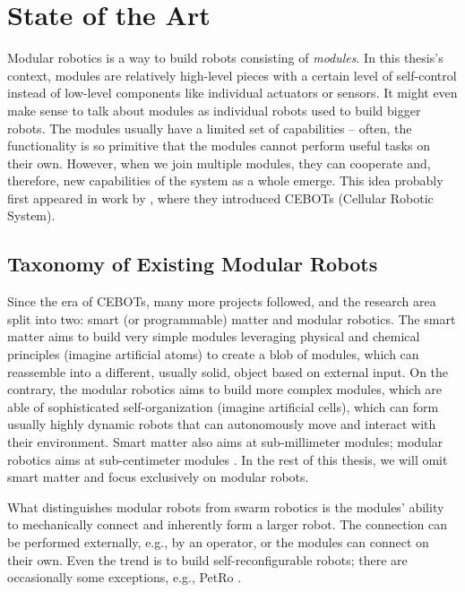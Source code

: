 \chapter{State of the Art}\label{chap:state-of-the-art}

Modular robotics is a way to build robots consisting of \emph{modules}. In this
thesis's context, modules are relatively high-level pieces with a certain level
of self-control instead of low-level components like individual actuators or
sensors. It might even make sense to talk about modules as individual robots
used to build bigger robots. The modules usually have a limited set of
capabilities -- often, the functionality is so primitive that the modules
cannot perform useful tasks on their own. However, when we join multiple
modules, they can cooperate and, therefore, new capabilities of the system as a
whole emerge. This idea probably first appeared in work by
\textcite{DBLP:conf/icra/FukudaK90}, where they introduced CEBOTs (Cellular
Robotic System).

\section{Taxonomy of Existing Modular Robots}

Since the era of CEBOTs, many more projects followed, and the research area
split into two: smart (or programmable) matter and modular robotics. The smart
matter aims to build very simple modules leveraging physical and chemical
principles (imagine artificial atoms) to create a blob of modules, which can
reassemble into a different, usually solid, object based on external input. On
the contrary, the modular robotics aims to build more complex modules, which are
able of sophisticated self-organization (imagine artificial cells), which can
form usually highly dynamic robots that can autonomously move and interact with
their environment. Smart matter also aims at sub-millimeter modules; modular
robotics aims at sub-centimeter modules \cite{DBLP:conf/ieeealife/Christensen07,
1285597}. In the rest of this thesis, we will omit smart matter and focus
exclusively on modular robots.

What distinguishes modular robots from swarm robotics is the modules' ability to
mechanically connect and inherently form a larger robot. The connection can be
performed externally, e.g., by an operator, or the modules can connect on their
own. Even the trend is to build self-reconfigurable robots; there are
occasionally some exceptions, e.g., PetRo \cite{DBLP:conf/ro-man/Salem14}.

